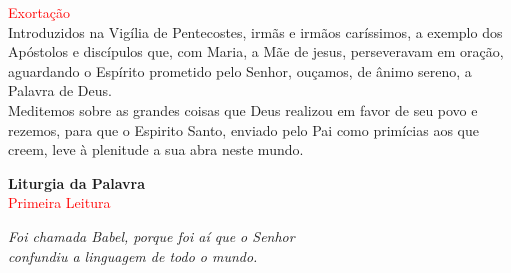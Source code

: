 \documentclass{book}
\begin{document}
\begin{flushleft}
    \newpage

    \textcolor{red}{Exortação}
    \vspace{0.2cm} \\
    Introduzidos na Vigília de Pentecostes, irmãs e irmãos caríssimos, a exemplo dos Apóstolos e discípulos que, com Maria, a Mãe de jesus, perseveravam em oração, aguardando o Espírito prometido pelo Senhor, ouçamos, de ânimo sereno, a Palavra de Deus. \\
    Meditemos sobre as grandes coisas que Deus realizou em favor de seu povo e rezemos, para que o Espirito Santo, enviado pelo Pai como primícias aos que creem, leve à plenitude a sua abra neste mundo.

\end{flushleft}

\begin{center}

    \textbf{Liturgia da Palavra}
    \vspace{0.5cm}\\
    \textcolor{red}{Primeira Leitura}

\end{center}

\begin{flushright}
    \textit{Foi chamada Babel, porque foi aí que o Senhor \\ confundiu a linguagem de todo o mundo.}
\end{flushright}
\end{document}
